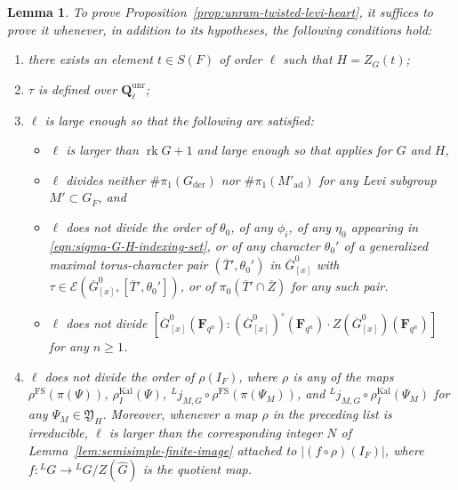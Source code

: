 \documentclass[reqno]{amsart}
\numberwithin{equation}{subsection}
\newcommand{\F}{\mathbf{F}}
\newcommand{\Q}{\mathbf{Q}}
\newcommand{\ol}[1]{\overline{#1}}
\newcommand{\wh}[1]{\widehat{#1}}
\newcommand{\co}{\colon}
\newcommand{\ld}{{}^L}
\newcommand\cE{\mathcal{E}}
\DeclareMathOperator{\ad}{ad}
\DeclareMathOperator{\unr}{unr}
\DeclareMathOperator{\FS}{FS}
\DeclareMathOperator{\Kal}{Kal}
\DeclareMathOperator{\der}{der}
\DeclareMathOperator{\rk}{rk}
\newtheorem{lemma}[thm]{Lemma}
\theoremstyle{remark}
\numberwithin{equation}{subsection}
\numberwithin{figure}{subsection}
\begin{document}
\begin{lemma}\label{lemma:endoscopic-reduction}
To prove Proposition~\ref{prop:unram-twisted-levi-heart}, it suffices to prove it whenever, in addition to its hypotheses, the following conditions hold:
\begin{enumerate}
\item there exists an element $t \in S(F)$ of order $\ell$ such that $H = Z_G(t)$;
\item $\tau$ is defined over $\Q_\ell^{\unr}$;
\item $\ell$ is large enough so that the following are satisfied:
\begin{itemize}
\item $\ell$ is larger than $\rk G + 1$ and large enough so that \cite[Theorem 1.3.1]{F24} applies for $G$ and $H$,
\item $\ell$ divides neither $\#\pi_1(G_{\der})$ nor $\#\pi_1(M'_{\ad})$ for any Levi subgroup $M' \subset G_{\ol F}$, and
\item $\ell$ does not divide the order of $\theta_0$, of any $\phi_i$, of any $\eta_0$ appearing in \eqref{eqn:sigma-G-H-indexing-set}, or of any character $\theta_0'$ of a generalized maximal torus-character pair $(\ol T', \theta_0')$ in $\ol G^0_{[x]}$ with $\tau \in \cE(\ol G^0_{[x]}, [\ol T', \theta_0'])$, or of $\pi_0(\ol T'\cap \ol Z)$ for any such pair.
\item $\ell$ does not divide $[\ol G^0_{[x]}(\F_{q^n}): (\ol G^0_{[x]})^\circ(\F_{q^n}) \cdot Z(\ol G^0_{[x]})(\F_{q^n})]$ for any $n \geq 1$.
\end{itemize}
\item $\ell$ does not divide the order of $\rho(I_F)$, where $\rho$ is any of the maps $\rho^{\FS}(\pi(\Psi))$, $\rho_I^{\Kal}(\Psi)$, $\ld j_{M,G}\circ\rho^{\FS}(\pi(\Psi_M))$, and $\ld j_{M,G}\circ\rho_I^{\Kal}(\Psi_M)$ for any $\Psi_M \in \mathfrak Y_H$. Moreover, whenever a map $\rho$ in the preceding list is irreducible, $\ell$ is larger than the corresponding integer $N$ of Lemma~\ref{lem:semisimple-finite-image} attached to $|(f\circ\rho)(I_F)|$, where $f \co \ld G \to \ld G/Z(\wh G)$ is the quotient map.
\end{enumerate}
\end{lemma}
\end{document}
